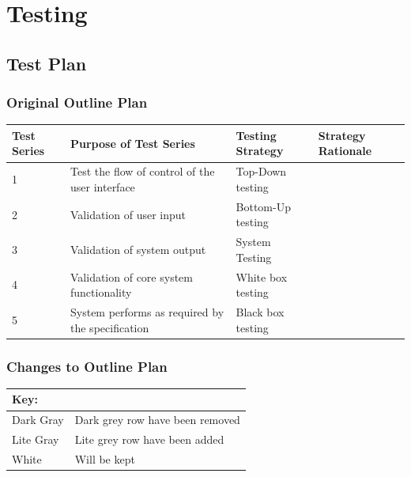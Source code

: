 \chapter{Testing}

\section{Test Plan}

\begin{landscape}
\subsection{Original Outline Plan}

\begin{center}
    \begin{tabular}{|p{2cm}|p{5cm}|p{5cm}|p{4cm}|}
        \hline
        \textbf{Test Series} & \textbf{Purpose of Test Series} & \textbf{Testing Strategy} & \textbf{Strategy Rationale}\\ \hline
        1 & Test the flow of control of the user interface  & Top-Down testing &  \\ \hline
        2 & Validation of user input & Bottom-Up testing &  \\ \hline
        3 & Validation of system output & System Testing & \\ \hline
        4 & Validation of core system functionality & White box testing & \\ \hline
        5 & System performs as required by the specification & Black box testing & \\ \hline
    \end{tabular}
\end{center}

\subsection{Changes to Outline Plan}


\begin{tabular}{|l|l|}
\hline
Key: & \\ \hline
\rowcolor{DarkGray} Dark Gray & Dark grey row have been removed \\ \hline
\rowcolor{LiteGray} Lite Gray & Lite grey row have been added\\ \hline
White & Will be kept \\ \hline

\end{tabular}



\end{landscape}
